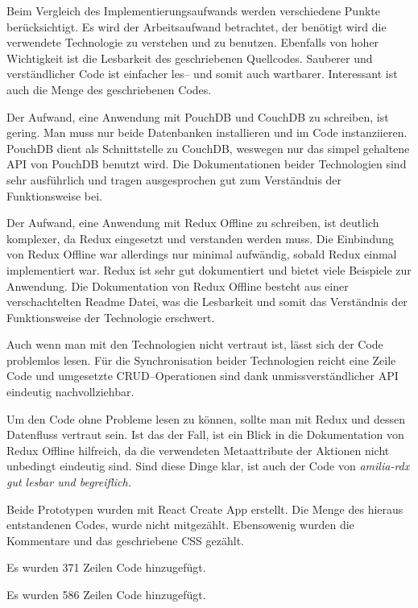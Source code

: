 Beim Vergleich des Implementierungsaufwands werden verschiedene Punkte berücksichtigt.
Es wird der Arbeitsaufwand betrachtet, der benötigt wird die verwendete Technologie zu verstehen und zu benutzen.
Ebenfalls von hoher Wichtigkeit ist die Lesbarkeit des geschriebenen Quellcodes.
Sauberer und verständlicher Code ist einfacher les-- und somit auch wartbarer. Interessant ist auch die Menge des geschriebenen Codes.
%
\begin{description}[leftmargin=0cm,style=nextline]
  \item[amilia-qouch]
  Der Aufwand, eine Anwendung mit PouchDB und CouchDB zu schreiben, ist gering.
  Man muss nur beide Datenbanken installieren und im Code instanziieren.
  PouchDB dient als Schnittstelle zu CouchDB, weswegen nur das simpel gehaltene \gls{API} von PouchDB benutzt wird.
  Die Dokumentationen beider Technologien sind sehr ausführlich und tragen ausgesprochen gut zum Verständnis der Funktionsweise bei.

  \item[amilia-rdx]
  Der Aufwand, eine Anwendung mit Redux Offline zu schreiben, ist deutlich komplexer, da Redux eingesetzt und verstanden werden muss.
  Die Einbindung von Redux Offline war allerdings nur minimal aufwändig, sobald Redux einmal implementiert war.
  Redux ist sehr gut dokumentiert und bietet viele Beispiele zur Anwendung.
  Die Dokumentation von Redux Offline besteht aus einer verschachtelten Readme Datei, was die Lesbarkeit und somit das Verständnis der Funktionsweise der Technologie erschwert.
\end{description}
%
\begin{description}[leftmargin=0cm,style=nextline]
  \item[amilia-qouch]
  Auch wenn man mit den Technologien nicht vertraut ist, lässt sich der Code problemlos lesen.
  Für die Synchronisation beider Technologien reicht eine Zeile Code und umgesetzte \gls{CRUD}--Operationen sind dank unmissverständlicher API eindeutig nachvollziehbar.
  \item[amilia-rdx] 
  Um den Code ohne Probleme lesen zu können, sollte man mit Redux und dessen Datenfluss vertraut sein.
  Ist das der Fall, ist ein Blick in die Dokumentation von Redux Offline hilfreich, da die verwendeten Metaattribute der Aktionen nicht unbedingt eindeutig sind.
  Sind diese Dinge klar, ist auch der Code von \it{amilia-rdx} gut lesbar und begreiflich.
\end{description}
%
  Beide Prototypen wurden mit React Create App erstellt.
  Die Menge des hieraus entstandenen Codes, wurde nicht mitgezählt. Ebensowenig wurden die Kommentare und das geschriebene \gls{CSS} gezählt.
\begin{description}[leftmargin=0cm,style=nextline]
    \item[amilia-qouch]
    Es wurden 371 Zeilen Code hinzugefügt.
    \item[amilia-rdx] 
    Es wurden 586 Zeilen Code hinzugefügt.
\end{description}
